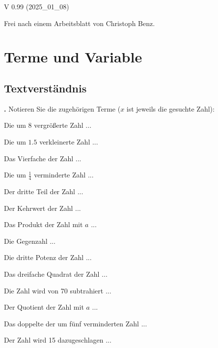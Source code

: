
\renewcommand{\bbwAufgabenBlockID}{Gl1LinTxt}

\renewcommand{\metaHeaderLine}{Textaufgaben}
\renewcommand{\arbeitsblattTitel}{Textaufgaben zu linearen Gleichungen}


\arbeitsblattHeader{}

\begin{center}V 0.99 (2025\_01\_08) \end{center}

{\tiny{Frei nach einem Arbeitsblatt von Christoph Benz.}}


\section{Terme und Variable}

\subsection{Textverständnis}
\textbf{\bbwAufgabenNummer{}.}
Notieren Sie die zugehörigen Terme ($x$ ist jeweils die gesuchte Zahl):


\begin{bbwAufgabenBlock}
\item Die um $8$ vergrößerte Zahl ... 
\item Die um $1.5$ verkleinerte Zahl ... 
\item Das Vierfache der Zahl ... 
\item Die um $\frac14$ verminderte Zahl ... 
\item Der dritte Teil der Zahl ... 
\item Der Kehrwert der Zahl ... 
\item Das Produkt der Zahl mit $a$ ... 
\item Die Gegenzahl ... 
\item Die dritte Potenz der Zahl ... 
\item Das dreifache Quadrat der Zahl ... 
\item Die Zahl wird von 70 subtrahiert ... 
\item Der Quotient der Zahl mit $a$ ... 
\item Das doppelte der um fünf verminderten Zahl
... 
\item Der Zahl wird 15 dazugeschlagen ... 
\end{bbwAufgabenBlock}

